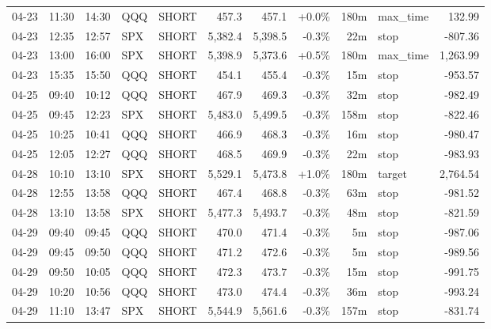 \documentclass[11pt,a4paper,twoside]{article}
\begin{document}
\begin{center}
\begin{longtable}{>{\color{txtmain}}l l l l l r r r r >{\color{txtmain}}l r}
04-23 & 11:30 & 14:30 & QQQ & SHORT & 457.3 & 457.1 & \textcolor{wingreen}{+0.0\%} & 180m & max\_time & \textcolor{wingreen}{132.99} \\
04-23 & 12:35 & 12:57 & SPX & SHORT & 5,382.4 & 5,398.5 & \textcolor{lossred}{-0.3\%} & 22m & stop & \textcolor{lossred}{-807.36} \\
04-23 & 13:00 & 16:00 & SPX & SHORT & 5,398.9 & 5,373.6 & \textcolor{wingreen}{+0.5\%} & 180m & max\_time & \textcolor{wingreen}{1,263.99} \\
04-23 & 15:35 & 15:50 & QQQ & SHORT & 454.1 & 455.4 & \textcolor{lossred}{-0.3\%} & 15m & stop & \textcolor{lossred}{-953.57} \\
04-25 & 09:40 & 10:12 & QQQ & SHORT & 467.9 & 469.3 & \textcolor{lossred}{-0.3\%} & 32m & stop & \textcolor{lossred}{-982.49} \\
04-25 & 09:45 & 12:23 & SPX & SHORT & 5,483.0 & 5,499.5 & \textcolor{lossred}{-0.3\%} & 158m & stop & \textcolor{lossred}{-822.46} \\
04-25 & 10:25 & 10:41 & QQQ & SHORT & 466.9 & 468.3 & \textcolor{lossred}{-0.3\%} & 16m & stop & \textcolor{lossred}{-980.47} \\
04-25 & 12:05 & 12:27 & QQQ & SHORT & 468.5 & 469.9 & \textcolor{lossred}{-0.3\%} & 22m & stop & \textcolor{lossred}{-983.93} \\
04-28 & 10:10 & 13:10 & SPX & SHORT & 5,529.1 & 5,473.8 & \textcolor{wingreen}{+1.0\%} & 180m & target & \textcolor{wingreen}{2,764.54} \\
04-28 & 12:55 & 13:58 & QQQ & SHORT & 467.4 & 468.8 & \textcolor{lossred}{-0.3\%} & 63m & stop & \textcolor{lossred}{-981.52} \\
04-28 & 13:10 & 13:58 & SPX & SHORT & 5,477.3 & 5,493.7 & \textcolor{lossred}{-0.3\%} & 48m & stop & \textcolor{lossred}{-821.59} \\
04-29 & 09:40 & 09:45 & QQQ & SHORT & 470.0 & 471.4 & \textcolor{lossred}{-0.3\%} & 5m & stop & \textcolor{lossred}{-987.06} \\
04-29 & 09:45 & 09:50 & QQQ & SHORT & 471.2 & 472.6 & \textcolor{lossred}{-0.3\%} & 5m & stop & \textcolor{lossred}{-989.56} \\
04-29 & 09:50 & 10:05 & QQQ & SHORT & 472.3 & 473.7 & \textcolor{lossred}{-0.3\%} & 15m & stop & \textcolor{lossred}{-991.75} \\
04-29 & 10:20 & 10:56 & QQQ & SHORT & 473.0 & 474.4 & \textcolor{lossred}{-0.3\%} & 36m & stop & \textcolor{lossred}{-993.24} \\
04-29 & 11:10 & 13:47 & SPX & SHORT & 5,544.9 & 5,561.6 & \textcolor{lossred}{-0.3\%} & 157m & stop & \textcolor{lossred}{-831.74} \\

\end{longtable}
\end{center}
\end{document}
